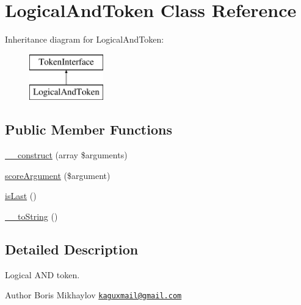 \hypertarget{class_prophecy_1_1_argument_1_1_token_1_1_logical_and_token}{}\section{Logical\+And\+Token Class Reference}
\label{class_prophecy_1_1_argument_1_1_token_1_1_logical_and_token}
Inheritance diagram for Logical\+And\+Token\+:\begin{figure}[H]
\begin{center}
\leavevmode
\includegraphics[height=2.000000cm]{class_prophecy_1_1_argument_1_1_token_1_1_logical_and_token}
\end{center}
\end{figure}
\subsection*{Public Member Functions}
\begin{DoxyCompactItemize}
\item 
\mbox{\hyperlink{class_prophecy_1_1_argument_1_1_token_1_1_logical_and_token_ae100579627fc7364dfae61182fbe1ac7}{\+\_\+\+\_\+construct}} (array \$arguments)
\item 
\mbox{\hyperlink{class_prophecy_1_1_argument_1_1_token_1_1_logical_and_token_a8d5bf47ab6eaa935458d5ad160e52822}{score\+Argument}} (\$argument)
\item 
\mbox{\hyperlink{class_prophecy_1_1_argument_1_1_token_1_1_logical_and_token_ac72b8349b1340887fc1af30eca2b951c}{is\+Last}} ()
\item 
\mbox{\hyperlink{class_prophecy_1_1_argument_1_1_token_1_1_logical_and_token_a7516ca30af0db3cdbf9a7739b48ce91d}{\+\_\+\+\_\+to\+String}} ()
\end{DoxyCompactItemize}


\subsection{Detailed Description}
Logical A\+ND token.

\begin{DoxyAuthor}{Author}
Boris Mikhaylov \href{mailto:kaguxmail@gmail.com}{\tt kaguxmail@gmail.\+com} 
\end{DoxyAuthor}


